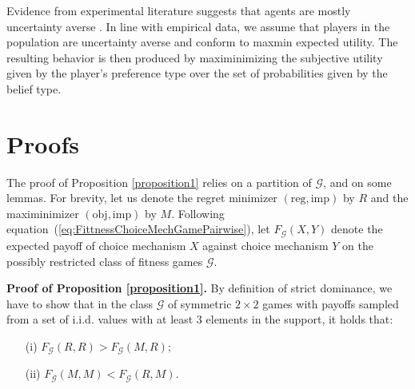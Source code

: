 \documentclass[fleqn,reqno,12pt]{article}
\theoremstyle{Satz}
\theoremstyle{Bsp}
\begin{document}
Evidence from experimental literature suggests that agents are mostly uncertainty averse \citep[e.g.,][]{TrautKuil16}. In line with empirical data, we assume that players in the population
are uncertainty averse and conform to maxmin expected utility. The resulting behavior is then
produced by maximinimizing the subjective utility given by the player's preference type over
the set of probabilities given by the belief type.

\fi

\section{Proofs}
\label{sec:proofs}

The proof of Proposition \ref{proposition1} relies on a partition of $\mathcal{G}$, and on some
lemmas. For brevity, let us denote the regret minimizer $(\text{reg}, \text{imp})$ by $R$ and
the maximinimizer $(\text{obj}, \text{imp})$ by $M$. Following
equation~(\ref{eq:FittnessChoiceMechGamePairwise}), let $F_{\mathcal{G}}(X,Y)$ denote the
expected payoff of choice mechanism $X$ against choice mechanism $Y$ on the possibly restricted
class of fitness games $\mathcal{G}$.

\vspace{.5cm}


\noindent \textbf{Proof of Proposition \ref{proposition1}.} By definition of strict dominance,
we have to show that in the class $\mathcal{G}$ of symmetric $2\times2$ games with payoffs
sampled from a set of i.i.d. values with at least 3 elements in the support, it holds that:
\begin{multicols}{2}
  \begin{itemize}
  \item[(i)] $F_{\mathcal{G}}(R,R)>F_{\mathcal{G}}(M,R);$
  \item[(ii)] $F_{\mathcal{G}}(M,M)<F_{\mathcal{G}}(R,M).$
  \end{itemize}
\end{multicols}
\end{document}
